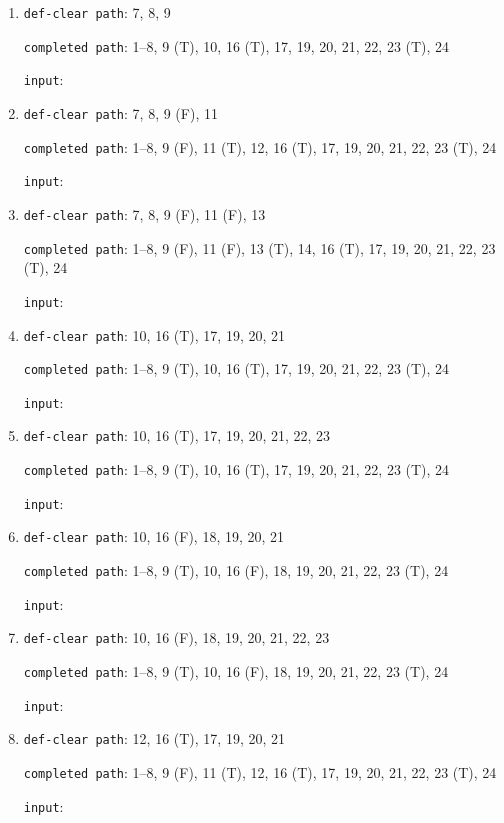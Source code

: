 \documentclass{article}
\begin{document}
\begin{enumerate}
    \item \texttt{def-clear path}: 7, 8, 9
          \par \texttt{completed path}: 1--8, 9 (T), 10, 16 (T), 17, 19, 20, 21, 22, 23 (T), 24
          \par \texttt{input}:

    \item \texttt{def-clear path}: 7, 8, 9 (F), 11
          \par \texttt{completed path}: 1--8, 9 (F), 11 (T), 12, 16 (T), 17, 19, 20, 21, 22, 23 (T), 24
          \par \texttt{input}:

    \item \texttt{def-clear path}: 7, 8, 9 (F), 11 (F), 13
          \par \texttt{completed path}: 1--8, 9 (F), 11 (F), 13 (T), 14, 16 (T), 17, 19, 20, 21, 22, 23 (T), 24
          \par \texttt{input}:

    \item \texttt{def-clear path}: 10, 16 (T), 17, 19, 20, 21
          \par \texttt{completed path}: 1--8, 9 (T), 10, 16 (T), 17, 19, 20, 21, 22, 23 (T), 24
          \par \texttt{input}:

    \item \texttt{def-clear path}: 10, 16 (T), 17, 19, 20, 21, 22, 23
          \par \texttt{completed path}: 1--8, 9 (T), 10, 16 (T), 17, 19, 20, 21, 22, 23 (T), 24
          \par \texttt{input}:

    \item \texttt{def-clear path}: 10, 16 (F), 18, 19, 20, 21
          \par \texttt{completed path}: 1--8, 9 (T), 10, 16 (F), 18, 19, 20, 21, 22, 23 (T), 24
          \par \texttt{input}:

    \item \texttt{def-clear path}: 10, 16 (F), 18, 19, 20, 21, 22, 23
          \par \texttt{completed path}: 1--8, 9 (T), 10, 16 (F), 18, 19, 20, 21, 22, 23 (T), 24
          \par \texttt{input}:

    \item \texttt{def-clear path}: 12, 16 (T), 17, 19, 20, 21
          \par \texttt{completed path}: 1--8, 9 (F), 11 (T), 12, 16 (T), 17, 19, 20, 21, 22, 23 (T), 24
          \par \texttt{input}:


\end{enumerate}
\end{document}
